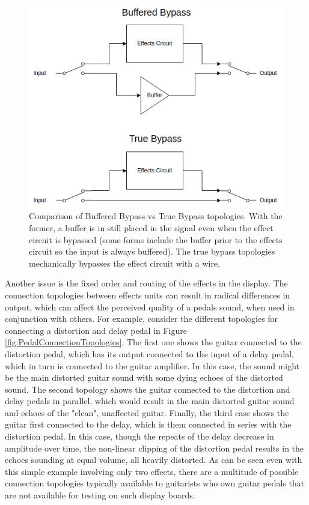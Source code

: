 \documentclass{article}
\begin{document}
	\begin{figure}
		\centering
		\includegraphics[width = 0.6 \textwidth]{PR2Images/BufferedvTrueBypass}
		\caption{Comparison of Buffered Bypass vs True Bypass topologies.  With the former, a buffer is in still placed in the signal even when the effect circuit is bypassed (some forms include the buffer prior to the effects circuit so the input is always buffered).  The true bypass topologies mechanically bypasses the effect circuit with a wire.}
		\label{fig:BufferedBypassConfig}
	\end{figure}


	Another issue is the fixed order and routing of the effects in the display.  The connection topologies between effects units can result in radical differences in output, which can affect the perceived quality of a pedals sound, when used in conjunction with others.  For example, consider the different topologies for connecting a distortion and delay pedal in Figure \ref{fig:PedalConnectionTopologies}.  The first one shows the guitar connected to the distortion pedal, which has its output connected to the input of a delay pedal, which in turn is connected to the guitar amplifier.  In this case, the sound might be the main distorted guitar sound with some dying echoes of the distorted sound.  The second topology shows the guitar connected to the distortion and delay pedals in parallel, which would result in the main distorted guitar sound and echoes of the "clean", unaffected guitar.  Finally, the third case shows the guitar first connected to the delay, which is them connected in series with the distortion pedal.  In this case, though the repeats of the delay decrease in amplitude over time, the non-linear clipping of the distortion pedal results in the echoes sounding at equal volume, all heavily distorted.  As can be seen even with this simple example involving only two effects, there are a multitude of possible connection topologies typically available to guitarists who own guitar pedals that are not available for testing on such display boards.
\end{document}
